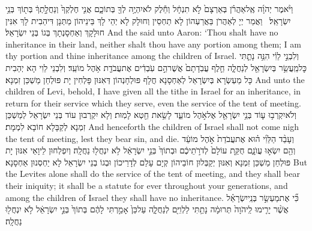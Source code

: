 {וַיֹּ֨אמֶר יְהֹוָ֜ה אֶֽל\maqqaf אַהֲרֹ֗ן בְּאַרְצָם֙ לֹ֣א תִנְחָ֔ל וְחֵ֕לֶק לֹא\maqqaf יִהְיֶ֥ה לְךָ֖ בְּתוֹכָ֑ם אֲנִ֤י חֶלְקְךָ֙ וְנַחֲלָ֣תְךָ֔ בְּת֖וֹךְ בְּנֵ֥י יִשְׂרָאֵֽל׃ \setuma }
{וַאֲמַר יְיָ לְאַהֲרֹן בַּאֲרַעְהוֹן לָא תַחְסֵין וְחוּלָק לָא יְהֵי לָךְ בֵּינֵיהוֹן מַתְּנָן דִּיהַבִית לָךְ אִנִּין חוּלָקָךְ וְאַחְסָנְתָךְ בְּגוֹ בְּנֵי יִשְׂרָאֵל׃}
{And the \lord\space said unto Aaron: ‘Thou shalt have no inheritance in their land, neither shalt thou have any portion among them; I am thy portion and thine inheritance among the children of Israel.}{}
{וְלִבְנֵ֣י לֵוִ֔י הִנֵּ֥ה נָתַ֛תִּי כׇּל\maqqaf מַֽעֲשֵׂ֥ר בְּיִשְׂרָאֵ֖ל לְנַחֲלָ֑ה חֵ֤לֶף עֲבֹֽדָתָם֙ אֲשֶׁר\maqqaf הֵ֣ם עֹֽבְדִ֔ים אֶת\maqqaf עֲבֹדַ֖ת אֹ֥הֶל מוֹעֵֽד׃}
{וְלִבְנֵי לֵוִי הָא יְהַבִית כָּל מַעְשְׂרָא בְּיִשְׂרָאֵל לְאַחְסָנָא חֲלָף פּוּלְחָנְהוֹן דְּאִנּוּן פָּלְחִין יָת פּוּלְחַן מַשְׁכַּן זִמְנָא׃}
{And unto the children of Levi, behold, I have given all the tithe in Israel for an inheritance, in return for their service which they serve, even the service of the tent of meeting.}{}
{וְלֹא\maqqaf יִקְרְב֥וּ ע֛וֹד בְּנֵ֥י יִשְׂרָאֵ֖ל אֶל\maqqaf אֹ֣הֶל מוֹעֵ֑ד לָשֵׂ֥את חֵ֖טְא לָמֽוּת׃}
{וְלָא יִקְרְבוּן עוֹד בְּנֵי יִשְׂרָאֵל לְמַשְׁכַּן זִמְנָא לְקַבָּלָא חוֹבָא לִמְמָת׃}
{And henceforth the children of Israel shall not come nigh the tent of meeting, lest they bear sin, and die.}{}
{וְעָבַ֨ד הַלֵּוִ֜י ה֗וּא אֶת\maqqaf עֲבֹדַת֙ אֹ֣הֶל מוֹעֵ֔ד וְהֵ֖ם יִשְׂא֣וּ עֲוֺנָ֑ם חֻקַּ֤ת עוֹלָם֙ לְדֹרֹ֣תֵיכֶ֔ם וּבְתוֹךְ֙ בְּנֵ֣י יִשְׂרָאֵ֔ל לֹ֥א יִנְחֲל֖וּ נַחֲלָֽה׃}
{וְיִפְלְחוּן לֵיוָאֵי אִנּוּן יָת פּוּלְחַן מַשְׁכַּן זִמְנָא וְאִנּוּן יְקַבְּלוּן חוֹבֵיהוֹן קְיָם עָלַם לְדָרֵיכוֹן וּבְגוֹ בְנֵי יִשְׂרָאֵל לָא יַחְסְנוּן אַחְסָנָא׃}
{But the Levites alone shall do the service of the tent of meeting, and they shall bear their iniquity; it shall be a statute for ever throughout your generations, and among the children of Israel they shall have no inheritance.}{}
{כִּ֞י אֶת\maqqaf מַעְשַׂ֣ר בְּנֵֽי\maqqaf יִשְׂרָאֵ֗ל אֲשֶׁ֨ר יָרִ֤ימוּ לַֽיהֹוָה֙ תְּרוּמָ֔ה נָתַ֥תִּי לַלְוִיִּ֖ם לְנַחֲלָ֑ה עַל\maqqaf כֵּן֙ אָמַ֣רְתִּי לָהֶ֔ם בְּתוֹךְ֙ בְּנֵ֣י יִשְׂרָאֵ֔ל לֹ֥א יִנְחֲל֖וּ נַחֲלָֽה׃ \petucha }
